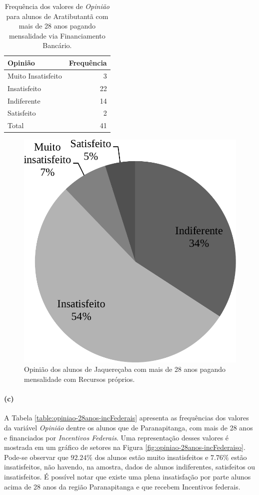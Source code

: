 \documentclass[10pt,a4paper,oneside]{article}
\newcommand{\arat}{Aratibutantã\xspace}
\newcommand{\jaqu}{Jaquereçaba\xspace}
\newcommand{\para}{Paranapitanga\xspace}
\begin{document}
\begin{table}[!h]
	\small
	\centering
	\caption{Frequência dos valores de \textit{Opinião} para alunos de \arat com mais de 28 anos pagando mensalidade via Financiamento Bancário.}
	\label{table:opiniao-28anos-proprios}
	\begin{tabular}{l r}
		\toprule
		\textbf{Opinião}    & \textbf{Frequência} \\
		\midrule
		Muito Insatisfeito  &  3  \\
		Insatisfeito        &  22 \\
		Indiferente         &  14 \\
		Satisfeito          &  2  \\
		\midrule
		Total               &  41 \\
		\bottomrule
	\end{tabular}
\end{table}

\begin{figure}[!h]
	\centering
	\includegraphics[width=.4\linewidth]{plots/q17b.pdf}
	\caption{Opinião dos alunos de \jaqu com mais de 28 anos pagando mensalidade com Recursos próprios.}
	\label{fig:opiniao-28anos-proprios}
\end{figure}

\paragraph{(c)}

A Tabela \ref{table:opiniao-28anos-incFederais} apresenta as frequências dos valores da variável \textit{Opinião} dentre os alunos que de \para, com mais de 28 anos e financiados por \textit{Incentivos Federais}. Uma representação desses valores é mostrada em um gráfico de setores na Figura \ref{fig:opiniao-28anos-incFederaiso}.
Pode-se observar que $92.24\%$ dos alunos estão muito insatisfeitos e $7.76\%$ estão insatisfeitos, não havendo, na amostra, dados de alunos indiferentes, satisfeitos ou insatisfeitos.
É possível notar que existe uma plena insatisfação por parte alunos acima de 28 anos da região \para e que recebem Incentivos federais.
\end{document}
